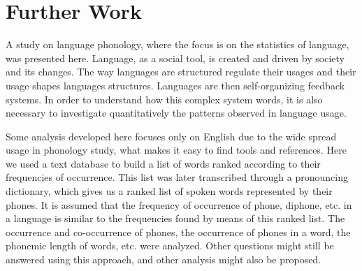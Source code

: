 \chapter{Further Work}

A study on language phonology, where the focus is on the statistics of language, was presented here. 
Language, as a social tool, is created and driven by society and its changes. 
The way languages are structured regulate their usages and their usage shapes languages structures. 
Languages are then self-organizing feedback systems.
In order to understand how this complex system words, it is also necessary to investigate quantitatively 
the patterns observed in language usage.

Some analysis developed here focuses only on English due to the wide spread usage in phonology study, 
what makes it easy to find tools and references. Here we used a text database to build a list of words 
ranked according to their frequencies of occurrence. This list was later transcribed through 
a pronouncing dictionary, which gives us a ranked list of spoken words represented by their phones. 
It is assumed that the frequency of occurrence of phone, diphone, etc. in a language is similar to 
the frequencies found by means of this ranked list. The occurrence and co-occurrence of phones, 
the occurrence of phones in a word, the phonemic length of words, etc. were analyzed. 
Other questions might still be answered using this approach, and other analysis might also be proposed.

